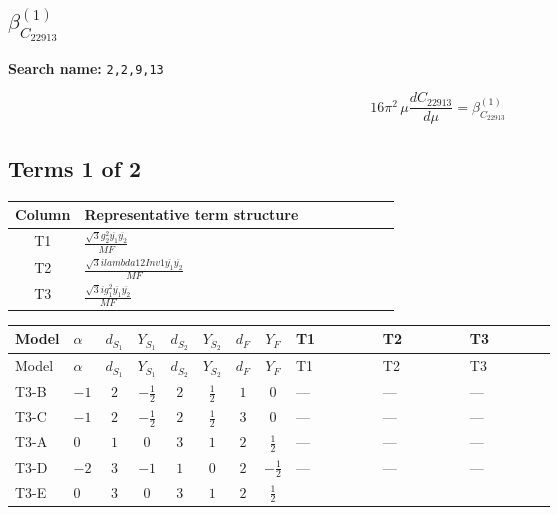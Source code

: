 \documentclass[8pt]{article}
\begin{document}
\begin{landscape}
\section*{$\beta_{C_{22913}}^{(1)}$}
\noindent\textbf{Search name: }\texttt{2,2,9,13}\par\smallskip
\[16\pi^2\,\mu\frac{d C_{22913}}{d\mu}=\beta_{C_{22913}}^{(1)}\]
\subsection*{Terms 1 of 2}
\begin{center}
\begin{tabular}{@{}c >{\raggedright\arraybackslash}p{0.82\linewidth}@{}}
\toprule
Column & Representative term structure \\
\midrule
T1 & \(\displaystyle \frac{\sqrt{3} g_{2}^{2} \overline{y_{1}} \overline{y_{2}}}{MF}\) \\
\midrule
T2 & \(\displaystyle \frac{\sqrt{3} i lambda12Inv1 \overline{y_{1}} \overline{y_{2}}}{MF}\) \\
\midrule
T3 & \(\displaystyle \frac{\sqrt{3} i g_{1}^{2} \overline{y_{1}} \overline{y_{2}}}{MF}\) \\
\midrule
\bottomrule
\end{tabular}
\end{center}
\smallskip
\tiny
\begin{longtable}{@{}llcccccc >{\raggedright\arraybackslash}p{0.21\linewidth} >{\raggedright\arraybackslash}p{0.21\linewidth} >{\raggedright\arraybackslash}p{0.21\linewidth}@{}}
\toprule
Model & $\alpha$ & $d_{S_1}$ & $Y_{S_1}$ & $d_{S_2}$ & $Y_{S_2}$ & $d_F$ & $Y_F$ & T1 & T2 & T3 \\
\midrule
\endfirsthead
\toprule
Model & $\alpha$ & $d_{S_1}$ & $Y_{S_1}$ & $d_{S_2}$ & $Y_{S_2}$ & $d_F$ & $Y_F$ & T1 & T2 & T3 \\
\midrule
\endhead
T3-B & $-1$ & $2$ & $-\frac{1}{2}$ & $2$ & $\frac{1}{2}$ & $1$ & $0$ & --- & --- & --- \\
\midrule
T3-C & $-1$ & $2$ & $-\frac{1}{2}$ & $2$ & $\frac{1}{2}$ & $3$ & $0$ & --- & --- & --- \\
\midrule
T3-A & $0$ & $1$ & $0$ & $3$ & $1$ & $2$ & $\frac{1}{2}$ & --- & --- & --- \\
\midrule
T3-D & $-2$ & $3$ & $-1$ & $1$ & $0$ & $2$ & $-\frac{1}{2}$ & --- & --- & --- \\
\midrule
T3-E & $0$ & $3$ & $0$ & $3$ & $1$ & $2$ & $\frac{1}{2}$ & \scriptsize\adjustbox{max width=\linewidth}{$\begin{gathered} - \frac{\sqrt{3} g_{2}^{2} \overline{y_{1}} \overline{y_{2}}}{6 MF}\end{gathered}$} & \scriptsize\adjustbox{max width=\linewidth}{$\begin{gathered} - \frac{\sqrt{3} i lambda12Inv1 \overline{y_{1}} \overline{y_{2}}}{6 MF}\end{gathered}$} & \scriptsize\adjustbox{max width=\linewidth}{$\begin{gathered} \frac{\sqrt{3} i g_{1}^{2} \overline{y_{1}} \overline{y_{2}}}{8 MF}\end{gathered}$} \\

\end{longtable}
\end{landscape}
\end{document}
